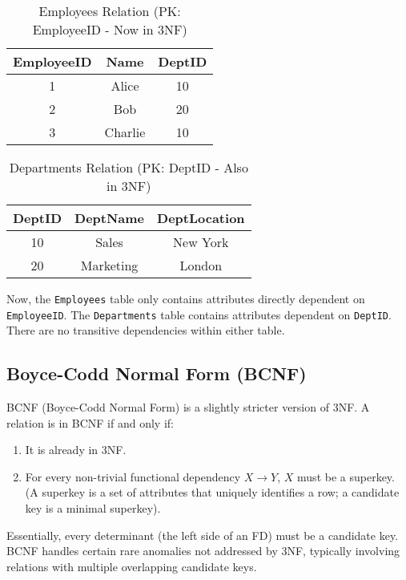 \documentclass[12pt]{book}
\begin{document}
\begin{table}[htbp]
\centering
\begin{tabular}{@{}ccc@{}}
\toprule
EmployeeID & Name & DeptID \\
\midrule
1 & Alice & 10 \\
2 & Bob & 20 \\
3 & Charlie & 10 \\
\bottomrule
\end{tabular}
\caption{Employees Relation (PK: EmployeeID - Now in 3NF)}
\label{tab:employees_3nf}
\end{table}

\begin{table}[htbp]
\centering
\begin{tabular}{@{}ccc@{}} %
\toprule
DeptID & DeptName & DeptLocation \\
\midrule
10 & Sales & New York \\
20 & Marketing & London \\
\bottomrule
\end{tabular}
\caption{Departments Relation (PK: DeptID - Also in 3NF)}
\label{tab:departments_3nf}
\end{table}
Now, the \texttt{Employees} table only contains attributes directly dependent on \texttt{EmployeeID}. The \texttt{Departments} table contains attributes dependent on \texttt{DeptID}. There are no transitive dependencies within either table.

\subsection{Boyce-Codd Normal Form (BCNF)}

BCNF (Boyce-Codd Normal Form) is a slightly stricter version of 3NF. A relation is in BCNF if and only if:
\begin{enumerate}
    \item It is already in 3NF.
    \item For every non-trivial functional dependency $X \rightarrow Y$, $X$ must be a superkey. (A superkey is a set of attributes that uniquely identifies a row; a candidate key is a minimal superkey).
\end{enumerate}

Essentially, every determinant (the left side of an FD) must be a candidate key. BCNF handles certain rare anomalies not addressed by 3NF, typically involving relations with multiple overlapping candidate keys.
\end{document}
